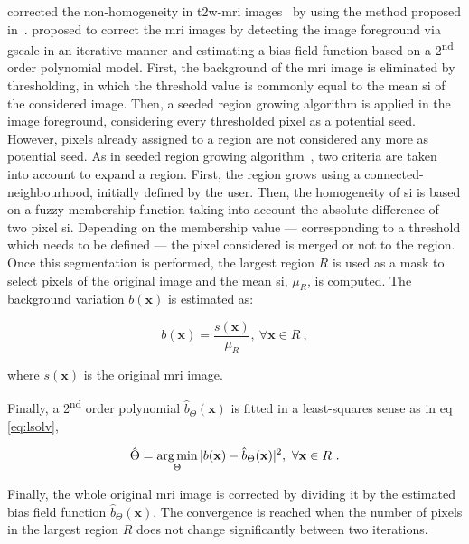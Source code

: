 \citeauthor{Lv2009} corrected the non-homogeneity in \ac{t2w}-\ac{mri} images~\cite{Lv2009} by using the method proposed in~\cite{Madabhushi2006}.
\citeauthor{Madabhushi2006} proposed to correct the \ac{mri} images by detecting the image foreground via \ac{gscale} in an iterative manner and estimating a bias field function based on a 2\textsuperscript{nd} order polynomial model.
First, the background of the \ac{mri} image is eliminated by thresholding, in which the threshold value is commonly equal to the mean \ac{si} of the considered image.
Then, a seeded region growing algorithm is applied in the image foreground, considering every thresholded pixel as a potential seed.
However, pixels already assigned to a region are not considered any more as potential seed.
As in seeded region growing algorithm~\cite{Shapiro2001}, two criteria are taken into account to expand a region.
First, the region grows using a connected-neighbourhood, initially defined by the user.
Then, the homogeneity of \ac{si} is based on a fuzzy membership function taking into account the absolute difference of two pixel \ac{si}.
Depending on the membership value --- corresponding to a threshold which needs to be defined --- the pixel considered is merged or not to the region.
Once this segmentation is performed, the largest region $R$ is used as a mask to select pixels of the original image and the mean \ac{si}, $\mu_{R}$, is computed. 
The background variation $b(\mathbf{x})$ is estimated as:

\begin{equation}
	b(\mathbf{x}) = \frac{s(\mathbf{x})}{\mu_{R}}, \ \forall \mathbf{x} \in R \ ,
	\label{eq:backest}
\end{equation}

\noindent where $s(\mathbf{x})$ is the original \ac{mri} image.

Finally, a 2\textsuperscript{nd} order polynomial $\hat{b}_{\Theta}(\mathbf{x})$ is fitted in a least-squares sense as in \acs{eq}\,\eqref{eq:lsolv},

\begin{equation}
	\hat{\Theta} = \operatorname*{arg\,min}_{\Theta} | b(\mathbf{x}) - \hat{b}_{\Theta}(\mathbf{x}) |^{2}, \ \forall \mathbf{x} \in R \ .
	\label{eq:lsolv}
\end{equation}

Finally, the whole original \ac{mri} image is corrected by dividing it by the estimated bias field function $\hat{b}_{\Theta}(\mathbf{x})$.
The convergence is reached when the number of pixels in the largest region $R$ does not change significantly between two iterations.

